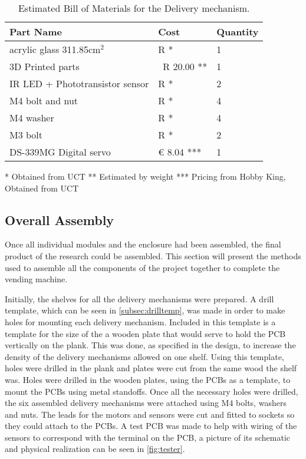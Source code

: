 \documentclass[a4paper,11pt]{article}
\numberwithin{figure}{section}
\numberwithin{table}{section}
\begin{document}
	\begin{table}[ht]
	\centering		
	\begin{tabular}{| m{8cm} | m{4cm}| m{3cm} |}
	\hline
	\textbf{Part Name} & \textbf{Cost} & \textbf{Quantity} \\
	\hline
	acrylic glass 311.85cm$^2$ & R * & 1 \\
	\hline
	3D Printed parts & ~R 20.00 ** & 1 \\
	\hline
	IR LED + Phototransistor sensor & R * & 2 \\
	\hline
	M4 bolt and nut & R * & 4 \\
	\hline 
	M4 washer & R * & 4 \\
	\hline	
	M3 bolt & R * & 2 \\
	\hline
	DS-339MG Digital servo & \euro{} 8.04 *** & 1 \\
	\hline
	\end{tabular}
	
	 * Obtained from UCT
	 ** Estimated by weight
	 *** Pricing from Hobby King, Obtained from UCT
	\caption{Estimated Bill of Materials for the Delivery mechanism. \label{tab:bomdel}}
	\end{table}	

\subsection{Overall Assembly}
\label{subsec:finbuild}
Once all individual modules and the enclosure had been assembled, the final product of the research could be assembled. This section will present the methods used to assemble all the components of the project together to complete the vending machine.

Initially, the shelves for all the delivery mechanisms were prepared. A drill template, which can be seen in \autoref{subsec:drilltemp}, was made in order to make holes for mounting each delivery mechanism. Included in this template is a template for the size of the a wooden plate that would serve to hold the PCB vertically on the plank. This was done, as specified in the design, to increase the density of the delivery mechanisms allowed on one shelf. Using this template, holes were drilled in the plank and plates were cut from the same wood the shelf was. Holes were drilled in the wooden plates, using the PCBs as a template, to mount the PCBs using metal standoffs. Once all the necessary holes were drilled, the six assembled delivery mechanisms were attached using M4 bolts, washers and nuts. The leads for the motors and sensors were cut and fitted to sockets so they could attach to the PCBs. A test PCB was made to help with wiring of the sensors to correspond with the terminal on the PCB, a picture of its schematic and physical realization can be seen in \autoref{fig:tester}.
\end{document}
